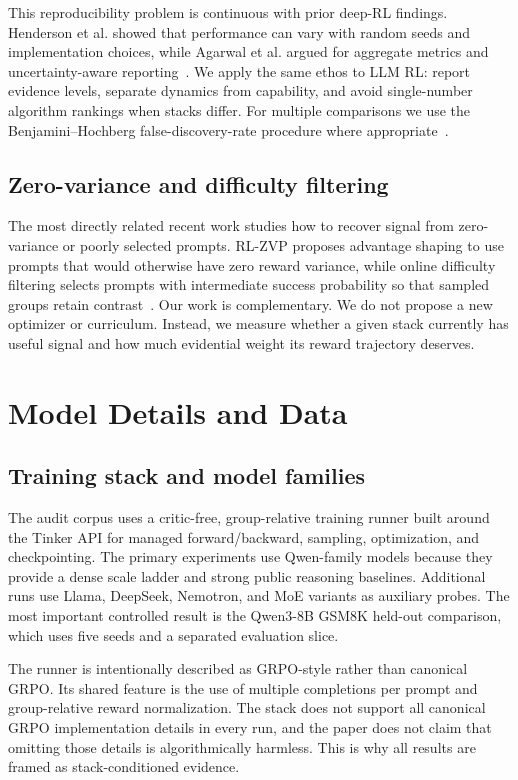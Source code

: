 \documentclass[runningheads,a4paper]{llncs}
\begin{document}
This reproducibility problem is continuous with prior deep-RL findings.
Henderson et al. showed that performance can vary with random seeds and
implementation choices, while Agarwal et al. argued for aggregate metrics and
uncertainty-aware reporting~\cite{henderson2018deep,agarwal2021deep}. We apply
the same ethos to LLM RL: report evidence levels, separate dynamics from
capability, and avoid single-number algorithm rankings when stacks differ.
For multiple comparisons we use the Benjamini--Hochberg false-discovery-rate
procedure where appropriate~\cite{benjamini1995controlling}.

\subsection{Zero-variance and difficulty filtering}

The most directly related recent work studies how to recover signal from
zero-variance or poorly selected prompts. RL-ZVP proposes advantage shaping to
use prompts that would otherwise have zero reward variance, while online
difficulty filtering selects prompts with intermediate success probability so
that sampled groups retain contrast~\cite{rlzvp2025,bae2025online}. Our work is
complementary. We do not propose a new optimizer or curriculum. Instead, we
measure whether a given stack currently has useful signal and how much
evidential weight its reward trajectory deserves.

\section{Model Details and Data}
\label{sec:model_data}

\subsection{Training stack and model families}

The audit corpus uses a critic-free, group-relative training runner built
around the Tinker API for managed forward/backward, sampling, optimization, and
checkpointing. The primary experiments use Qwen-family models because they
provide a dense scale ladder and strong public reasoning baselines. Additional
runs use Llama, DeepSeek, Nemotron, and MoE variants as auxiliary probes. The
most important controlled result is the Qwen3-8B GSM8K held-out comparison,
which uses five seeds and a separated evaluation slice.

The runner is intentionally described as GRPO-style rather than canonical GRPO.
Its shared feature is the use of multiple completions per prompt and
group-relative reward normalization. The stack does not support all canonical
GRPO implementation details in every run, and the paper does not claim that
omitting those details is algorithmically harmless. This is why all results are
framed as stack-conditioned evidence.
\end{document}
